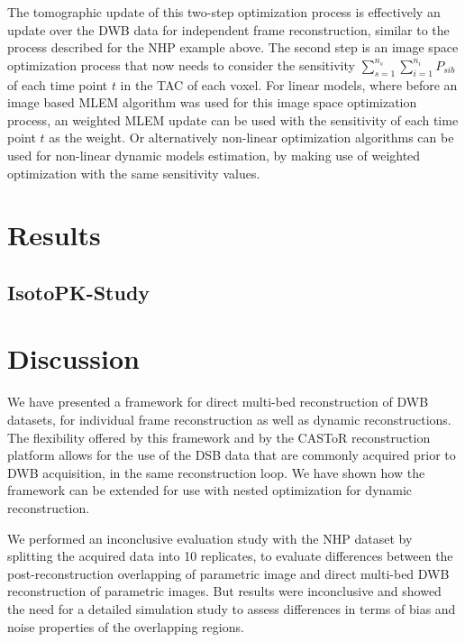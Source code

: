 The tomographic update of this two-step optimization process is effectively an update over the DWB data for independent frame reconstruction, similar to the process described for the NHP example above. The second step is an image space optimization process that now needs to consider the sensitivity $\sum_{s=1}^{n_s} \sum_{i=1}^{n_i}  P_{sib}$ of each time point $t$ in the TAC of each voxel. For linear models, where before an image based MLEM algorithm was used for this image space optimization process, an weighted MLEM update can be used with the sensitivity of each time point $t$ as the weight. Or alternatively non-linear optimization algorithms can be used for non-linear dynamic models estimation, by making use of weighted optimization with the same sensitivity values.

\section{Results}

\subsection{IsotoPK-Study}

\section{Discussion}
We have presented a framework for direct multi-bed reconstruction of DWB datasets, for individual frame reconstruction as well as dynamic reconstructions. The flexibility offered by this framework and by the CASToR reconstruction platform allows for the use of the DSB data that are commonly acquired prior to DWB acquisition, in the same reconstruction loop. We have shown how the framework can be extended for use with nested optimization for dynamic reconstruction.

We performed an inconclusive evaluation study with the NHP dataset by splitting the acquired data into 10 replicates, to evaluate differences between the post-reconstruction overlapping of parametric image and direct multi-bed DWB reconstruction of parametric images. But results were inconclusive and showed the need for a detailed simulation study to assess differences in terms of bias and noise properties of the overlapping regions. 
